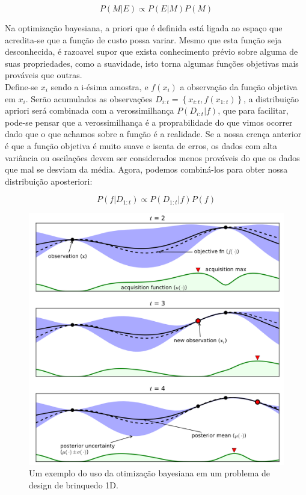 \documentclass[
	12pt,				%
	twoside,		%
	a4paper,		%
	chapter=TITLE,		   %
	section=TITLE,		   %
	subsection=TITLE,	   %
	subsubsection=TITLE, %
	english,			%
	french,				%
	spanish,			%
	brazil,				%
]{abntex2}
\begin{document}
\[
P(M|E) \propto P(E|M)P(M)
\]

Na optimização bayesiana, a priori que é definida está ligada ao espaço
que acredita-se que a função de custo possa variar. Mesmo que esta
função seja desconhecida, é razoavel supor que exista conhecimento
prévio sobre alguma de suas propriedades, como a suavidade, isto torna
algumas funções objetivas mais prováveis que outras.\\

Define-se \(x_i\) sendo a i-ésima amostra, e \(f(x_i)\) a observação da
função objetiva em \(x_i\). Serão acumulados as observações
\(D_{i:t}=\left\{ x_{i:t},f(x_{1:t}) \right\}\), a distribuição apriori
será combinada com a verossimilhança \(P(D_{i:t}|f)\), que para
facilitar, pode-se pensar que a verossimilhança é a proprabilidade do
que vimos ocorrer dado que o que achamos sobre a função é a realidade.
Se a nossa crença anterior é que a função objetiva é muito suave e
isenta de erros, os dados com alta variância ou oscilações devem ser
considerados menos prováveis do que os dados que mal se desviam da
média. Agora, podemos combiná-los para obter nossa distribuição
aposteriori:

\[
P(f|D_{1:t}) \propto P(D_{1:t}|f)P(f)
\]

\begin{figure}
\centering
\includegraphics[width=\textwidth,height=0.5\textheight]{images/bo.png}
\caption{Um exemplo do uso da otimização bayesiana em um problema de
design de brinquedo 1D.\label{bo}}
\end{figure}
\end{document}
